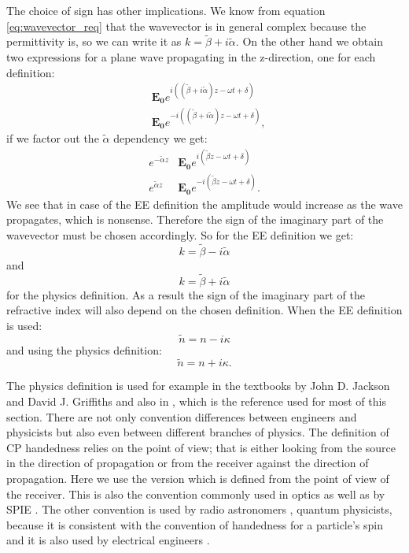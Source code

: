 The choice of sign has other implications. We know from equation \ref{eq:wavevector_req} that the wavevector is in general complex because the permittivity is, so we can write it as $k=\tilde{\beta} + i \tilde{\alpha}$. On the other hand we obtain two expressions for a plane wave propagating in the z-direction, one for each definition:
\begin{align}
    &\bm{E_{0}}e^{i((\tilde{\beta} + i \tilde{\alpha})z-\omega t + \delta)} \\
    &\bm{E_{0}}e^{-i((\tilde{\beta} + i \tilde{\alpha})z-\omega t + \delta)}, 
\end{align}
if we factor out the $\tilde{\alpha}$ dependency we get:
\begin{align}
    e^{-\tilde{\alpha} z}&\bm{E_{0}}e^{i(\tilde{\beta} z-\omega t + \delta)} \\
    e^{\tilde{\alpha} z}&\bm{E_{0}}e^{-i(\tilde{\beta} z-\omega t + \delta)}. 
\end{align}
We see that in case of the EE definition the amplitude would increase as the wave propagates, which is nonsense. Therefore the sign of the imaginary part of the wavevector must be chosen accordingly. So for the EE definition we get:
\begin{equation}
    k=\tilde{\beta} - i \tilde{\alpha}
\end{equation}
and 
\begin{equation}
    k=\tilde{\beta} + i \tilde{\alpha}
\end{equation}
for the physics definition.
As a result the sign of the imaginary part of the refractive index will also depend on the chosen definition. When the EE definition is used:
\begin{equation}
    \tilde{n}= n - i \kappa
\end{equation}
and using the physics definition:  
\begin{equation}
    \tilde{n}= n + i \kappa.
\end{equation}

The physics definition is used for example in the textbooks by John D. Jackson \cite{Jackson1998} and David J. Griffiths \cite{Griffiths2017} and also in \cite{Collett2009}, which is the reference used for most of this section.
There are not only convention differences between engineers and physicists but also even between different branches of physics. The definition of CP handedness relies on the point of view; that is either looking from the source in the direction of propagation or from the receiver against the direction of propagation. Here we use the version which is defined from the point of view of the receiver. This is also the convention commonly used in optics \cite{Bass1995, M.LandiDeglInnocenti2004} as well as by SPIE \cite{Collett2009}.
The other convention is used by radio astronomers \cite{Born1999}, quantum physicists, because it is consistent with the convention of handedness for a particle's spin and it is also used by electrical engineers \cite{Orfanidis2004}.

